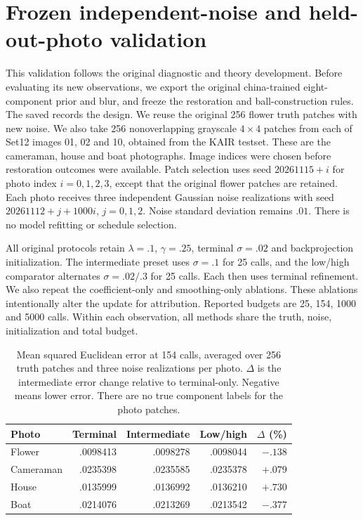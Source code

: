 \section{Frozen independent-noise and held-out-photo validation}
\label{sec:independent_patch}
This validation follows the original diagnostic and theory
development. Before evaluating its new observations, we export the
original china-trained eight-component prior and blur, and freeze
the restoration and ball-construction rules.
The saved 
records the design.
We reuse the original 256 flower truth patches with new noise.
We also take 256 nonoverlapping grayscale $4\times4$ patches from
each of Set12 images 01, 02 and 10, obtained from the KAIR testset.
These are the cameraman, house and boat photographs.
Image indices were chosen before restoration outcomes were available.
Patch selection uses seed $20261115+i$ for photo index $i=0,1,2,3$,
except that the original flower patches are retained.
Each photo receives three independent Gaussian noise realizations
with seed $20261112+j+1000i$, $j=0,1,2$.
Noise standard deviation remains $.01$.
There is no model refitting or schedule selection.

All original protocols retain $\lambda=.1$, $\gamma=.25$,
terminal $\sigma=.02$ and backprojection initialization.
The intermediate preset uses $\sigma=.1$ for 25 calls, and the
low/high comparator alternates $\sigma=.02/.3$ for 25 calls.
Each then uses terminal refinement.
We also repeat the coefficient-only and smoothing-only ablations.
These ablations intentionally alter the update for attribution.
Reported budgets are 25, 154, 1000 and 5000 calls.
Within each observation, all methods share the truth, noise,
initialization and total budget.

\begin{table}[t]
\centering\small
\setlength{\tabcolsep}{3pt}
\begin{tabular}{lrrrr}
\toprule
Photo & Terminal & Intermediate & Low/high & $\Delta$ (\%)\\
\midrule
Flower & .0098413 & .0098278 & .0098044 & $-.138$\\
Cameraman & .0235398 & .0235585 & .0235378 & $+.079$\\
House & .0135999 & .0136992 & .0136210 & $+.730$\\
Boat & .0214076 & .0213269 & .0213542 & $-.377$\\
\bottomrule
\end{tabular}
\caption{Mean squared Euclidean error at 154 calls, averaged over
256 truth patches and three noise realizations per photo.
$\Delta$ is the intermediate error change relative to terminal-only.
Negative means lower error. There are no true component labels for
the photo patches.}
\label{tab:independent_photo_risk}
\end{table}

